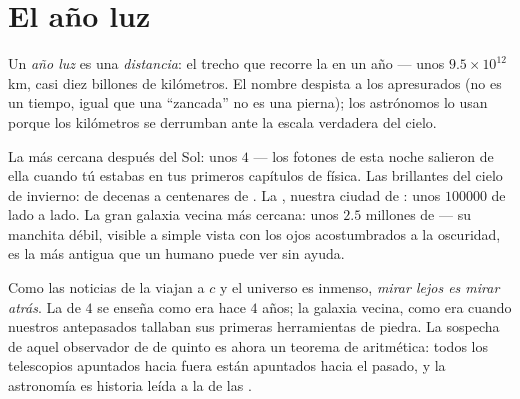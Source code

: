 \section{El año luz}

\begin{definition}\label{def:g8:speed-of-light:lightyear}
Un \emph{año luz} es una \emph{distancia}: el trecho que
recorre la  en un año --- unos $9.5 \times 10^{12}$ km, casi
diez billones de kilómetros. El nombre despista a los apresurados (no
es un tiempo, igual que una ``zancada'' no es una pierna); los
astrónomos lo usan porque los kilómetros se derrumban ante la escala
verdadera del cielo.
\end{definition}

\begin{example}\label{ex:g8:speed-of-light:ladder}
La  más cercana después del Sol: unos $4$
 --- los fotones de esta noche salieron de ella cuando tú
estabas en tus primeros capítulos de física. Las 
brillantes del cielo de invierno: de decenas a centenares de
. La , nuestra ciudad de
: unos $100000$  de lado a lado. La
gran galaxia vecina más cercana: unos $2.5$ millones de
 --- su manchita débil, visible a simple vista con los
ojos acostumbrados a la oscuridad, es la  más antigua que un
humano puede ver sin ayuda.
\end{example}

\begin{proposition}\label{prop:g8:speed-of-light:timemachine}
Como las noticias de la  viajan a $c$ y el universo es
inmenso, \emph{mirar lejos es mirar atrás}. La  de $4$
 se enseña como era hace $4$ años; la galaxia vecina,
como era cuando nuestros antepasados tallaban sus primeras
herramientas de piedra. La sospecha de aquel observador de  de
quinto es ahora un teorema de aritmética: todos los telescopios
apuntados hacia fuera están apuntados hacia el pasado, y la astronomía
es historia leída a la  de las .
\end{proposition}

